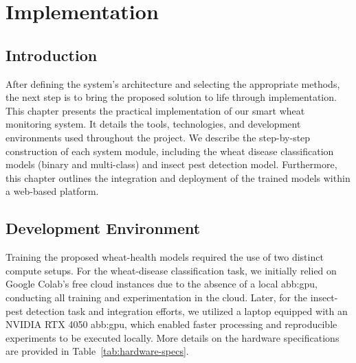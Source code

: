 \chapter{Implementation}


\section{Introduction}
After defining the system's architecture and selecting the appropriate methods, the next step is to bring the proposed solution to life through implementation. This chapter presents the practical implementation of our smart wheat monitoring system. It details the tools, technologies, and development environments used throughout the project. We describe the step-by-step construction of each system module, including the wheat disease classification models (binary and multi-class) and insect pest detection model. Furthermore, this chapter outlines the integration and deployment of the trained models within a web-based platform.


\section{Development Environment}
Training the proposed wheat-health models required the use of two distinct compute setups. For the wheat-disease classification task, we initially relied on Google Colab’s free cloud instances due to the absence of a local \gls{abb:gpu}, conducting all training and experimentation in the cloud. Later, for the insect-pest detection task and integration efforts, we utilized a laptop equipped with an NVIDIA RTX 4050 \gls{abb:gpu}, which enabled faster processing and reproducible experiments to be executed locally. More details on the hardware specifications are provided in Table~\ref{tab:hardware-specs}.

\begin{table}[H]
    \caption{Hardware specifications by task}
    \centering
    \label{tab:hardware-specs}
\end{table}

